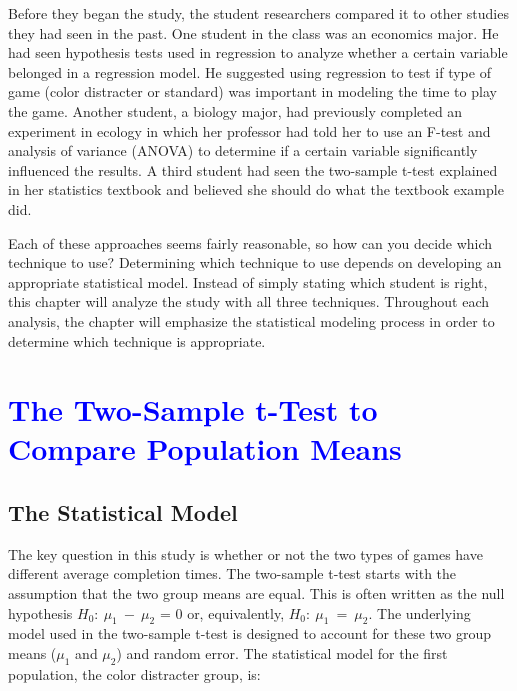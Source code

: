\documentclass[
]{report}
\begin{document}
Before they began the study, the student researchers compared it to other studies they had seen in the past. One student in the class was an economics major. He had seen hypothesis tests used in regression to analyze whether a certain variable belonged in a regression model. He suggested using regression to test if type of game (color distracter or standard) was important in modeling the time to play the game. Another student, a biology major, had previously completed an experiment in ecology in which her professor had told her to use an F-test and analysis of variance (ANOVA) to determine if a certain variable significantly influenced the results. A third student had seen the two-sample t-test explained in her statistics textbook and believed she should do what the textbook example did.

Each of these approaches seems fairly reasonable, so how can you decide which technique to use? Determining which technique to use depends on developing an appropriate statistical model. Instead of simply stating which student is right, this chapter will analyze the study with all three techniques. Throughout each analysis, the chapter will emphasize the statistical modeling process in order to determine which technique is appropriate.

\hypertarget{section-15}{%
\section{\texorpdfstring{\textcolor{blue}{ The Two-Sample t-Test to Compare Population Means}}{}}\label{section-15}}

\par

\hypertarget{the-statistical-model}{%
\subsection{The Statistical Model}\label{the-statistical-model}}

The key question in this study is whether or not the two types of games have different average completion times. The two-sample t-test starts with the assumption that the two group means are equal. This is often written as the null hypothesis \(\scriptstyle H_0 :\  \mu_1 \ -\  \mu_2\) = 0 or, equivalently, \(\scriptstyle H_0 :\  \mu_1 \ =\  \mu_2\). The underlying model used in the two-sample t-test is designed to account for these two group means (\(\scriptstyle \mu_1\) and \(\scriptstyle \mu_2\)) and random error. The statistical model for the first population, the color distracter group, is:
\end{document}
